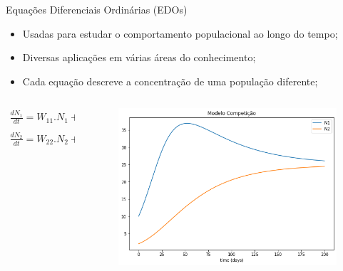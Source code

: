 \begin{frame}{Equações Diferenciais Ordinárias (EDOs)}
    \begin{itemize}
        \item Usadas para estudar o comportamento populacional ao longo do tempo;
        \item Diversas aplicações em várias áreas do conhecimento; 
        \item Cada equação descreve a concentração de uma população diferente;
    \end{itemize}

    \begin{columns}
        \begin{column}{.4\textwidth}
            \begin{equation}
                \begin{array}{lr}
                    \frac{dN_1}{dt} = W_{11}.N_1 + W_{21}.N_2
                    \\
                    \\
                    \frac{dN_2}{dt} = W_{22}.N_2 + W_{12}.N_1
                \end{array}
            \end{equation}
        \end{column}

        \begin{column}{.6\textwidth}
            \begin{figure}
                \centering
                \includegraphics[height=.7\textheight]{beamerthemesrc/images/ode}
            \end{figure}
        \end{column}
    \end{columns}
\end{frame}

